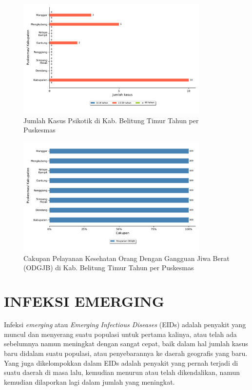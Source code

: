 \begin{figure}[H]
	\centering
	\includegraphics[width=0.85\textwidth]{bab_06/bab_06_16b_psikotik}
	\caption{Jumlah Kasus Psikotik di Kab. Belitung Timur Tahun \tP per Puskesmas}
	\label{fig:Kasus-Psikotik}
\end{figure}

\begin{figure}[H]
  \centering
  \includegraphics[width=0.85\textwidth]{bab_06/bab_06_16c_pelayananODGJB}
  \caption{Cakupan Pelayanan Kesehatan Orang Dengan Gangguan Jiwa Berat (ODGJB) di Kab. Belitung Timur Tahun \tP per Puskesmas}
  \label{fig:Pelayanan-ODGJB}
\end{figure}

\section[INFEKSI EMERGING]{INFEKSI EMERGING}
Infeksi \textit{emerging} atau \textit{Emerging Infectious Diseases} (EIDs) adalah penyakit yang muncul dan menyerang suatu populasi untuk pertama kalinya, atau telah ada sebelumnya namun meningkat dengan sangat cepat, baik dalam hal jumlah kasus baru didalam suatu populasi, atau penyebarannya ke daerah geografis yang baru.
Yang juga dikelompokkan dalam EIDs adalah penyakit yang pernah terjadi di suatu daerah di masa lalu, kemudian menurun atau telah dikendalikan, namun kemudian dilaporkan lagi dalam jumlah yang meningkat.

